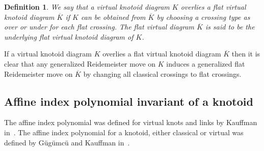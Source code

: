 \documentclass[11pt]{amsart}
\theoremstyle{noparens}
\newtheorem{definition}{Definition}[section]
\numberwithin{equation}{section}
\numberwithin{equation}{section}
\begin{document}
\begin{definition}{\rm 
We say that a virtual knotoid diagram $K$ \textit{overlies} a flat virtual knotoid diagram $\overline{K}$ if $K$ can be  obtained from $\overline{K}$ by choosing a crossing type as over or under for each flat crossing. The flat virtual diagram $\overline{K}$ is said to be the \textit{underlying flat virtual knotoid diagram} of $K$. }
\end{definition}

If a virtual knotoid diagram $K$ overlies a flat virtual knotoid diagram $\overline{K}$ then it is clear that any generalized Reidemeister move on $K$ induces a generalized flat Reidemeister move on $\overline{K}$ by changing all classical crossings to flat crossings.

\subsection{Affine index polynomial invariant of a  knotoid} 
The affine index polynomial was defined for virtual knots and links by Kauffman in~\cite{Kau}. The affine index polynomial for a knotoid, either classical or virtual was defined by  G\"{u}g\"{u}mc\"{u} and Kauffman in~\cite{GK}. 
\end{document}
